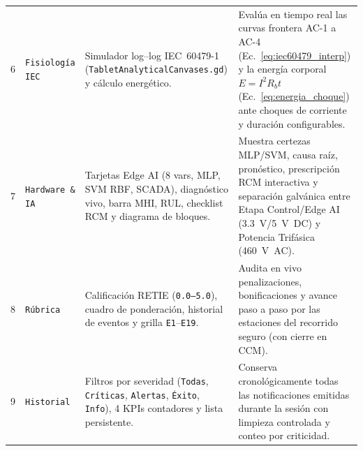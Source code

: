 \begin{table}[!t]
\begin{tabularx}{\textwidth}{@{} c >{\raggedright\arraybackslash}p{2.35cm} >{\raggedright\arraybackslash}p{4.35cm} >{\raggedright\arraybackslash}X @{}}
6 & \texttt{Fisiología IEC} & Simulador log--log IEC~60479-1~\cite{IEC60479} (\texttt{Tablet\allowbreak Analytical\allowbreak Canvases.gd}) y cálculo energético. & Evalúa en tiempo real las curvas frontera AC-1 a AC-4 (Ec.~\eqref{eq:iec60479_interp}) y la energía corporal $E=I^2 R_b t$ (Ec.~\eqref{eq:energia_choque}) ante choques de corriente y duración configurables. \\
7 & \texttt{Hardware \& IA} & Tarjetas Edge AI (\num{8} vars, MLP, SVM RBF, SCADA), diagnóstico vivo, barra MHI, RUL, checklist RCM y diagrama de bloques. & Muestra certezas MLP/SVM, causa raíz, pronóstico, prescripción RCM interactiva y separación galvánica entre Etapa Control/Edge AI (\qty{3.3}{\volt}/\qty{5}{\volt}~DC) y Potencia Trifásica (\qty{460}{\volt}~AC). \\
8 & \texttt{Rúbrica} & Calificación RETIE (\texttt{0.0--5.0}), cuadro de ponderación, historial de eventos y grilla \texttt{E1}--\texttt{E19}. & Audita en vivo penalizaciones, bonificaciones y avance paso a paso por las estaciones del recorrido seguro (con cierre en CCM). \\
9 & \texttt{Historial} & Filtros por severidad (\texttt{Todas}, \texttt{Críticas}, \texttt{Alertas}, \texttt{Éxito}, \texttt{Info}), \num{4} KPIs contadores y lista persistente. & Conserva cronológicamente todas las notificaciones emitidas durante la sesión con limpieza controlada y conteo por criticidad. \\
\bottomrule
\end{tabularx}
\endgroup
\end{table}

